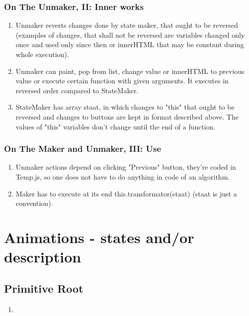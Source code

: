 \documentclass[12pt]{article}
\begin{document}
\subsubsection{On The Unmaker, II: Inner works}
\begin {enumerate}
	\item Unmaker reverts changes done by state maker, that ought to be reversed (examples of changes, that shall not be reversed are variables changed only once and used only since then or innerHTML that may be constant during whole execution).
	\item Unmaker can paint, pop from list, change value or innerHTML to previous value or execute certain function with given arguments. It executes in reversed order compared to StateMaker.
	\item StateMaker has array staat, in which changes to "this" that ought to be reversed and changes to buttons are kept in format described above. The values of "this" variables don't change until the end of a function.
\end {enumerate}

\subsubsection{On The Maker and Unmaker, III: Use}
\begin {enumerate}
	\item Unmaker actions depend on clicking "Previous" button, they're coded in Temp.js, so one does not have to do anything in code of an algorithm.
	\item Maker has to execute at its end this.transformator(staat) (staat is just a convention).
\end {enumerate}

\section{Animations - states and/or description}
\subsection{Primitive Root}
\begin{enumerate}
	\item 
\end{enumerate}
\end{document}
